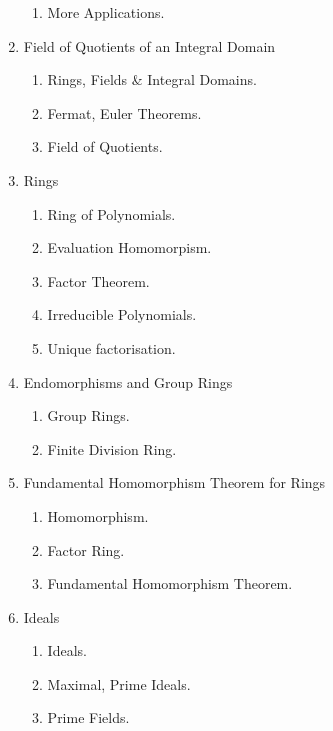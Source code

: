 \begin{enumerate}[label=Topic \arabic*]
\begin{enumerate}[label=Session \arabic*]
		\item More Applications.
	\end{enumerate}
	\item Field of Quotients of an Integral Domain
	\begin{enumerate}[label=Session \arabic*]
		\item Rings, Fields \& Integral Domains.
		\item Fermat, Euler Theorems.
		\item Field of Quotients.
	\end{enumerate}
	\item Rings
	\begin{enumerate}[label=Session \arabic*]
		\item Ring of Polynomials.
		\item Evaluation Homomorpism.
		\item Factor Theorem.
		\item Irreducible Polynomials.
		\item Unique factorisation.
	\end{enumerate}
	\item Endomorphisms and Group Rings
	\begin{enumerate}[label=Session \arabic*]
		\item Group Rings.
		\item Finite Division Ring.
	\end{enumerate}
	\item Fundamental Homomorphism Theorem for Rings
	\begin{enumerate}[label=Session \arabic*]
		\item Homomorphism.
		\item Factor Ring.
		\item Fundamental Homomorphism Theorem.
	\end{enumerate}
	\item Ideals
	\begin{enumerate}[label=Session \arabic*]
		\item Ideals.
		\item Maximal, Prime Ideals.
		\item Prime Fields.
	\end{enumerate}
\end{enumerate}

